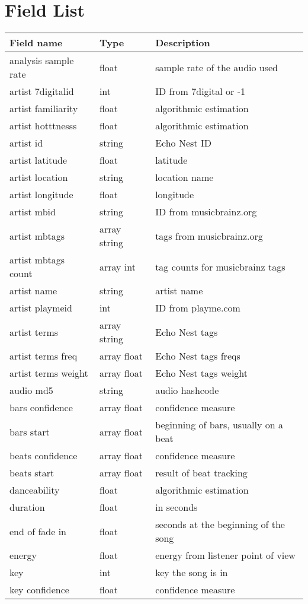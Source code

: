 \section{Field List} %
\label{sec:field_list}

\begin{center}

\begin{tabular}{l|l|l}
\textbf{Field name}     & \textbf{Type}   & \textbf{Description} \\
\hline
analysis sample rate & float & sample rate of the audio used\\
artist 7digitalid& int & ID from 7digital or -1 \\
artist familiarity & float & algorithmic estimation\\
artist hotttnesss & float & algorithmic estimation\\
artist id & string & Echo Nest ID\\
artist latitude & float & latitude\\
artist location & string & location name\\
artist longitude & float & longitude\\
artist mbid & string & ID from musicbrainz.org\\
artist mbtags & array string & tags from musicbrainz.org\\
artist mbtags count & array int & tag counts for musicbrainz tags\\
artist name & string & artist name\\
artist playmeid & int & ID from playme.com\\
artist terms & array string & Echo Nest tags\\
artist terms freq & array float & Echo Nest tags freqs\\
artist terms weight & array float & Echo Nest tags weight\\
audio md5 & string & audio hashcode\\
bars confidence & array float & confidence measure\\
bars start & array float & beginning of bars, usually on a beat\\
beats confidence & array float & confidence measure\\
beats start & array float & result of beat tracking\\
danceability & float & algorithmic estimation\\
duration & float & in seconds\\
end of fade in & float & seconds at the beginning of the song\\
energy & float & energy from listener point of view\\
key & int & key the song is in\\
key confidence & float & confidence measure\\

\end{tabular}
\end{center}
